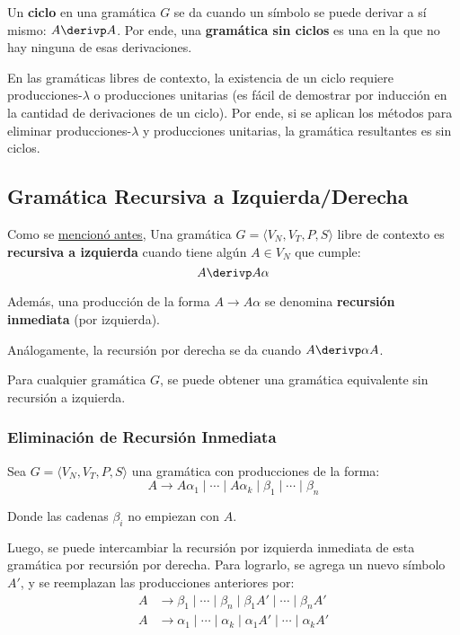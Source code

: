 Un \textbf{ciclo} en una gramática $G$ se da cuando un símbolo se puede derivar a sí mismo: $A \derivp A$. Por ende, una \textbf{gramática sin ciclos} es una en la que no hay ninguna de esas derivaciones.

En las gramáticas libres de contexto, la existencia de un ciclo requiere producciones-$\lambda$ o producciones unitarias (es fácil de demostrar por inducción en la cantidad de derivaciones de un ciclo). Por ende, si se aplican los métodos para eliminar producciones-$\lambda$ y producciones unitarias, la gramática resultantes es sin ciclos.

\subsection{Gramática Recursiva a Izquierda/Derecha}

Como se \hyperref[recursiva-a-izquierda-cota]{mencionó antes}, Una gramática $G = \langle V_N, V_T, P, S \rangle$ libre de contexto es \textbf{recursiva a izquierda} cuando tiene algún $A \in V_N$ que cumple:
$$
    A \derivp A \alpha
$$

Además, una producción de la forma $A \to A \alpha$ se denomina \textbf{recursión inmediata} (por izquierda).

Análogamente, la recursión por derecha se da cuando $A \derivp \alpha A$.

Para cualquier gramática $G$, se puede obtener una gramática equivalente sin recursión a izquierda.

\subsubsection{Eliminación de Recursión Inmediata}

Sea $G = \langle V_N, V_T, P, S \rangle$ una gramática con producciones de la forma:
$$
    A \to A \alpha_1 \mid \cdots \mid A \alpha_k \mid \beta_1 \mid \cdots \mid \beta_n
$$

Donde las cadenas $\beta_i$ no empiezan con $A$.

Luego, se puede intercambiar la recursión por izquierda inmediata de esta gramática por recursión por derecha. Para lograrlo, se agrega un nuevo símbolo $A'$, y se reemplazan las producciones anteriores por:
$$
\begin{aligned}
    A & \to \beta_1 \mid \cdots \mid \beta_n \mid \beta_1 A' \mid \cdots \mid \beta_n A' \\
    A & \to \alpha_1 \mid \cdots \mid \alpha_k \mid \alpha_1 A' \mid \cdots \mid \alpha_k A'
\end{aligned}
$$

